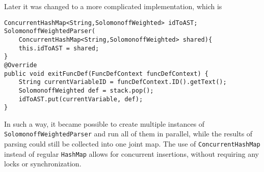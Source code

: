 Later it was changed to a more complicated implementation, which is
\begin{lstlisting}
ConcurrentHashMap<String,SolomonoffWeighted> idToAST;
SolomonoffWeightedParser(
    ConcurrentHashMap<String,SolomonoffWeighted> shared){
    this.idToAST = shared;
}
@Override
public void exitFuncDef(FuncDefContext funcDefContext) {
    String currentVariableID = funcDefContext.ID().getText();
    SolomonoffWeighted def = stack.pop();
    idToAST.put(currentVariable, def);
}
\end{lstlisting}
In such a way, it became possible to create multiple instances of 
\texttt{SolomonoffWeightedParser} and run all of them in parallel, while the results of parsing could still be collected into one joint map.
The use of \texttt{ConcurrentHashMap} instead of regular \texttt{HashMap} allows for concurrent insertions, without requiring any locks or synchronization. 

